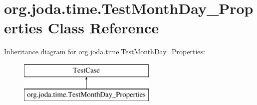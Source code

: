 \hypertarget{classorg_1_1joda_1_1time_1_1_test_month_day___properties}{\section{org.\-joda.\-time.\-Test\-Month\-Day\-\_\-\-Properties Class Reference}
\label{classorg_1_1joda_1_1time_1_1_test_month_day___properties}
}
Inheritance diagram for org.\-joda.\-time.\-Test\-Month\-Day\-\_\-\-Properties\-:\begin{figure}[H]
\begin{center}
\leavevmode
\includegraphics[height=2.000000cm]{classorg_1_1joda_1_1time_1_1_test_month_day___properties}
\end{center}
\end{figure}
